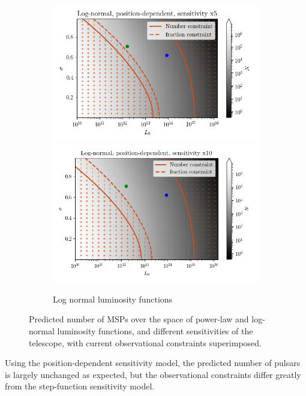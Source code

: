 \documentclass{C://Aliases//Dropbox-MIT//Latex_Templates//personal}
\begin{document}
\begin{figure}
\begin{subfigure}[t]{.45\textwidth}
        \includegraphics[width=.99\linewidth]{figs/log-normal/log-normal-pos-x5.png}
        \includegraphics[width=.99\linewidth]{figs/log-normal/log-normal-pos-x10.png}
        \caption{Log normal luminosity functions}
    \end{subfigure}
    \caption{Predicted number of MSPs over the space of power-law and log-normal luminosity functions, and different sensitivities of the telescope, with current observational constraints superimposed.}
    \label{fig:sensitivity-increase}
\end{figure}

Using the position-dependent sensitivity model, the predicted number of pulsars is largely unchanged as expected, but the observational constraints differ greatly from the step-function sensitivity model.
\end{document}

